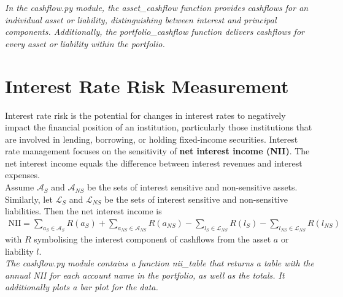 \documentclass[11pt]{article}
\begin{document}
\textit{In the cashflow.py module, the asset\_cashflow function provides cashflows for an individual asset or liability, distinguishing between interest and principal components. Additionally, the portfolio\_cashflow function delivers cashflows for every asset or liability within the portfolio.}



\section{Interest Rate Risk Measurement}

Interest rate risk is the potential for changes in interest rates to negatively impact the financial position of an institution, particularly those institutions that are involved in lending, borrowing, or holding fixed-income securities. Interest rate management focuses on the sensitivity of \textbf{net interest income (NII)}.  The net interest income equals the difference between interest revenues and interest expenses.\\

Assume $\mathcal{A}_S$ and $\mathcal{A}_{NS}$ be the sets of interest sensitive and non-sensitive assets. Similarly, let $\mathcal{L}_S$ and $\mathcal{L}_{NS}$ be the sets of interest sensitive and non-sensitive liabilities. Then the net interest income is
\begin{align}
	\text{NII}=\sum_{a_S\in\mathcal{A}_S}R(a_S)+\sum_{a_{NS}\in\mathcal{A}_{NS}}R(a_{NS})-\sum_{l_S\in\mathcal{L}_{NS}}R(l_S)-\sum_{l_{NS}\in\mathcal{L}_{NS}}R(l_{NS})
\end{align}
with $R$ symbolising the interest component of cashflows from the asset $a$ or liability $l$.\\


\textit{The \textit{cashflow.py} module contains a function \textit{nii\_table} that returns a table with the annual NII for each account name in the portfolio, as well as the totals. It additionally plots a bar plot for the data.} \\
\end{document}
